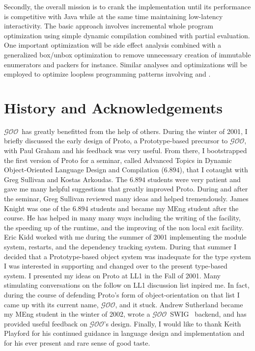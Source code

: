 \documentclass[twoside,twocolumn,9pt]{extarticle}
\newcommand{\goo}{$\mathcal{GOO}$}
\begin{document}
Secondly, the overall mission is to crank the implementation until its
performance is competitive with Java while at the same time
maintaining low-latency interactivity.  The basic approach involves
incremental whole program optimization using simple dynamic
compilation combined with partial evaluation.  One important
optimization will be side effect analysis combined with a generalized
box/unbox optimization to remove unnecessary creation of immutable
enumerators and packers for instance.  Similar analyses and
optimizations will be employed to optimize loopless programming
patterns involving  and .

\section{History and Acknowledgements} 

\goo\ has greatly benefitted from the help of others.  During the
winter of 2001, I briefly discussed the early design of Proto, a
Prototype-based precursor to \goo, with Paul Graham and his feedback
was very useful.  From there, I bootstrapped the first version of
Proto for a seminar, called Advanced Topics in Dynamic Object-Oriented
Language Design and Compilation ($6.894$), that I cotaught with Greg
Sullivan and Kostas Arkoudas.  The $6.894$ students were very patient
and gave me many helpful suggestions that greatly improved Proto.
During and after the seminar, Greg Sullivan reviewed many ideas and
helped tremendously.  James Knight was one of the $6.894$ students and
became my MEng student after the course.  He has helped in many many
ways including the writing of the  facility, the
speeding up of the runtime, and the improving of the non local exit
facility.  Eric Kidd worked with me during the summer of 2001
implementing the module system, restarts, and the dependency tracking
system.  During that summer I decided that a Prototype-based object
system was inadequate for the type system I was interested in
supporting and changed over to the present type-based system.  I
presented my ideas on Proto at LL1 in the Fall of 2001.  Many
stimulating conversations on the follow on LL1 discussion list inpired
me.  In fact, during the course of defending Proto's form of
object-orientation on that list I came up with its current name, \goo,
and it stuck.  Andrew Sutherland became my MEng student in the winter
of 2002, wrote a \goo\ SWIG~\cite{Beaz96a} backend, and has provided
useful feedback on \goo's design.  Finally, I would like to thank
Keith Playford for his continued guidance in language design and
implementation and for his ever present and rare sense of good taste.
\end{document}
